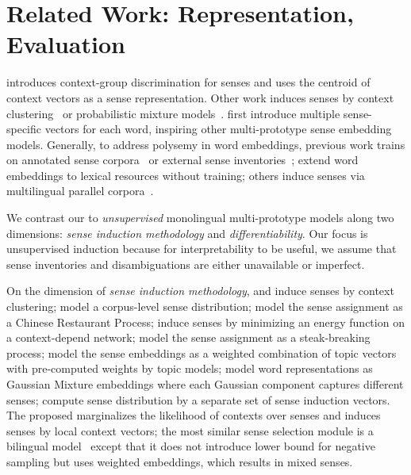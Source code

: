  
\section{Related Work: Representation, Evaluation}
\label{sec:related}

 introduces context-group discrimination
for senses and uses the centroid of context vectors as a sense
representation. Other work induces senses by context
clustering~\citep{purandare2004word} or probabilistic mixture
models~\citep{brody2009bayesian}.  first
introduce multiple sense-specific vectors for each word, inspiring
other multi-prototype sense embedding models. Generally, to address
polysemy in word embeddings, previous work trains on annotated
sense corpora~\citep{sensEmbed,gomez-perez-19} or external sense
inventories~\citep{remb13,chen2014unified,jauhar2015ontologically,taoSense,wu2015sense,pilehvar2016,sw2v};
extend word embeddings to lexical resources without training; others
induce senses via multilingual parallel
corpora~\citep{guo2014learning,vsuster2016bilingual,ettinger2016retrofitting}.

We contrast our \gasi{} to \emph{unsupervised} monolingual
multi-prototype models along two dimensions: \emph{sense induction
methodology} and
\emph{differentiability}.  Our focus is unsupervised induction because for interpretability to be
useful, we assume that sense inventories and disambiguations are
either unavailable or imperfect.

On the dimension of \emph{sense induction methodology}, 
and  induce senses by context
clustering;  model a corpus-level sense
distribution;  model the sense assignment as a
Chinese Restaurant Process;
 induce senses by minimizing an energy
function on a context-depend network; 
model the sense assignment as a steak-breaking process; 
model the sense embeddings as a weighted combination of topic vectors
with pre-computed weights by topic models;  model word representations as Gaussian Mixture
embeddings where each Gaussian component captures different
senses;  compute sense distribution by a separate set
of sense induction vectors. The proposed \gasi{} marginalizes the
likelihood of contexts over senses and induces senses by local context
vectors; the most similar sense selection module is a bilingual
model~\citep{vsuster2016bilingual} except that it does not introduce
lower bound for negative sampling but uses weighted embeddings, 
which results in mixed senses.


